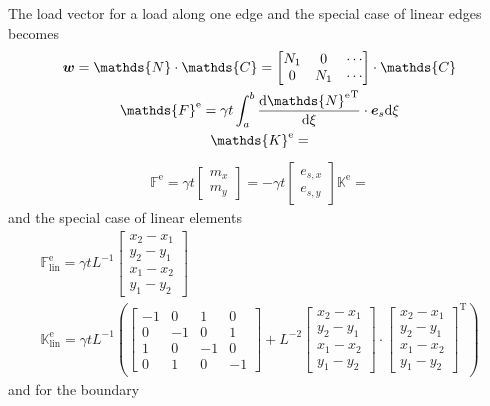 \documentclass[a4paper,11pt]{article}
\renewcommand{\to}[1]{\text{\boldmath $#1$}} %
\newcommand{\uv}[1]{\mathds{#1}}
\newcommand{\um}[1]{\mathds{#1}}
\newcommand{\intd}[1]{\mathrm{d}#1}
\newcommand{\dderiv}[2]{\frac{\mathrm{d}#1}{\mathrm{d}#2}}
\newcommand{\T}{\mathrm{T}}
\newcommand{\element}{\mathrm{e}}
\newcommand{\linear}{\mathrm{lin}}
\begin{document}
The load vector for a load along one edge and the special case of linear edges becomes
\begin{gather}
 \to w = \um{N}\cdot\um{C} = \begin{bmatrix}N_1 & 0 & \cdots\\ 0 & N_1 & \cdots \end{bmatrix}\cdot \um{C}\\
 \uv F^\element = \gamma t \int_a^b \dderiv{{\um N^\element}^\T}{\xi}\cdot \to e_s \intd\xi\\
 \um K^\element = 
\end{gather}
\begin{gather}
 \uv F^\element = \gamma t \begin{bmatrix}m_x\\m_y\end{bmatrix} = - \gamma t \begin{bmatrix}e_{s,x}\\e_{s,y}\end{bmatrix}
 \um K^\element = 
\end{gather}
and the special case of linear elements
\begin{gather}
 \uv F^\element_\linear = \gamma t L^{-1} \begin{bmatrix}x_2-x_1\\y_2-y_1\\x_1-x_2\\y_1-y_2\end{bmatrix}\\
 \um K^\element_\linear = \gamma t L^{-1}\left(
	\begin{bmatrix}-1&0&1&0\\0&-1&0&1\\1&0&-1&0\\0&1&0&-1\end{bmatrix}+
	L^{-2}\begin{bmatrix}x_2-x_1\\y_2-y_1\\x_1-x_2\\y_1-y_2\end{bmatrix}\cdot\begin{bmatrix}x_2-x_1\\y_2-y_1\\x_1-x_2\\y_1-y_2\end{bmatrix}^\T
  \right)
\end{gather}
and for the boundary
\end{document}
